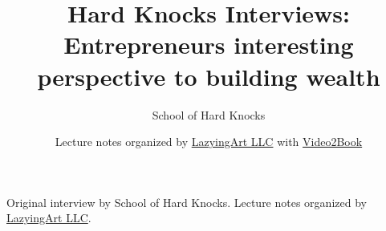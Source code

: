 \documentclass[11pt,oneside]{book}
\begin{document}
\frontmatter
\title{Hard Knocks Interviews: Entrepreneurs interesting perspective to building wealth}
\author{School of Hard Knocks}
\date{Lecture notes organized by \href{https://lazying.art}{LazyingArt LLC} with \href{https://github.com/lachlanchen/Video2Book}{Video2Book}}
\maketitle
\begin{center}
\small Original interview by School of Hard Knocks. Lecture notes organized by \href{https://lazying.art}{LazyingArt LLC}.
\end{center}
\clearpage
\mainmatter

\end{document}
